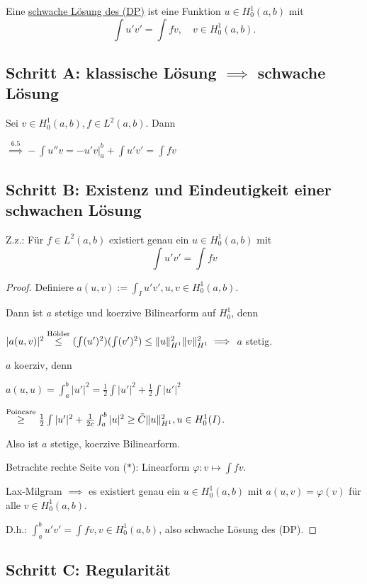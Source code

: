 Eine \underline{schwache Lösung des (DP)} ist eine Funktion $u \in H_0^1(a,b)$ mit
$$
\int u' v' = \int fv, \quad v \in H_0^1(a,b).
$$

\subsection*{Schritt A: klassische Lösung $\implies$ schwache Lösung}

Sei $v \in H_0^1(a,b), f \in L^2(a,b)$. Dann

$\overset{\text{6.5}}{\implies} -\int u'' v = -u' v |_a^b + \int u' v' = \int f v$

\subsection*{Schritt B: Existenz und Eindeutigkeit einer schwachen Lösung}

Z.z.: Für $f \in L^2(a,b)$ existiert genau ein $u \in H_0^1(a,b)$ mit 
\begin{displaymath}
  \int u' v' = \int f v \tag{$\ast$}
\end{displaymath}

\begin{proof}
  Definiere $a(u,v) := \int_I u' v', u,v \in H_0^1(a,b)$.

  Dann ist $a$ stetige und koerzive Bilinearform auf $H_0^1$, denn

  $|a(u,v)|^2 \overset{\text{Hölder}}{\leq} (\int (u')^2) (\int (v')^2) \leq \lVert u \rVert_{H^1}^2 \lVert v \rVert_{H^1}^2 \implies$ $a$ stetig.

  $a$ koerziv, denn

  $a(u,u) = \int_a^b |u'|^2 = \frac{1}{2} \int |u'|^2 + \frac{1}{2} \int |u'|^2$ 
  
  $\overset{\text{Poincare}}{\geq} \frac{1}{2} \int |u'|^2 + \frac{1}{2c} \int_a^b |u|^2 \geq \tilde C \lVert u \rVert_{H^1}^2, u \in H_0^1(I)$.

  Also ist $a$ stetige, koerzive Bilinearform.

  Betrachte rechte Seite von ($\ast$): Linearform $\varphi \colon v \mapsto \int f v$.
  
  Lax-Milgram $\implies$ es existiert genau ein $u \in H_0^1(a,b)$ mit $a(u,v) = \varphi(v)$ für alle $v \in H_0^1(a,b)$.

  D.h.: $\int_a^b u' v' = \int f v, v \in H_0^1(a,b)$, also schwache Lösung des (DP).
\end{proof}

\subsection*{Schritt C: Regularität}

